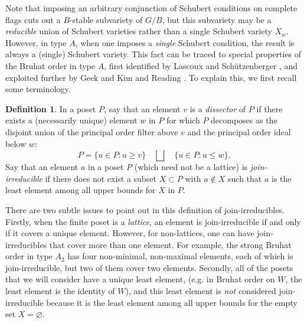 \documentclass[12pt,dvips]{amsart}
\theoremstyle{plain}
\theoremstyle{definition}
\newtheorem{definition}[theorem]{Definition}
\theoremstyle{remark}
\numberwithin{equation}{section}
\begin{document}
Note that imposing an arbitrary conjunction of Schubert conditions on 
complete flags cuts out a $B$-stable subvariety of $G/B$, 
but this subvariety may be a {\it reducible}
union of Schubert varieties rather than a single Schubert variety $X_w$.
However, in type $A$, when one imposes a {\it single} Schubert condition, the result is
always a (single) Schubert variety. This fact can be
traced to special properties of the Bruhat order in type $A$,
%
%
first identified by Lascoux and Sch\"utzenberger \cite{LascouxSchutzenberger}, 
and exploited further by Geck and Kim \cite{GeckKim} and Reading \cite{Reading}. 
To explain this, we first recall some terminology.

\begin{definition}
In a poset $P$, say that an element $v$ is a {\it dissector} of $P$ if
there exists a (necessarily unique) element $w$ in $P$ for which $P$
decomposes as the disjoint union of the principal order filter above $v$ and the
principal order ideal below $w$:
$$
P= \{u \in P: u \geq v \} \quad \bigsqcup \quad \{u \in P: u \leq w \}.                                                              
$$
Say that an element $a$ in a poset $P$ (which need not be a lattice) is
{\it join-irreducible}
if there does not exist a subset $X \subset P$ with $a \not\in X$
such that $a$ is the least element among all upper bounds for $X$ in $P$.
\end{definition}

There are two subtle issues to point out in this definition of
join-irreducibles.  Firstly, when the finite poset is a {\it lattice}, an element
is join-irreducible if and only if it covers a unique element.  
However, for non-lattices, one can have join-irreducibles 
that cover more than one element.  
For example, the strong Bruhat order in type $A_2$ has four non-minimal, non-maximal elements,
each of which is join-irreducible, but two of them cover two elements.
Secondly, all of the posets that we will consider have a unique least element,
(e.g. in Bruhat order on $W$, the least element is the identity of $W$), and this least element
is {\it not} considered join-irreducible because it is the least element among all upper
bounds for the empty set $X=\varnothing$.
\end{document}
